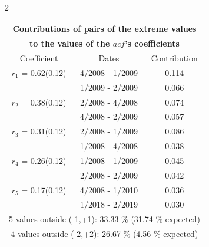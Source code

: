 
\thispagestyle{empty}
\begin{multicols}{2}{ 
\begin{tabular}{ccc}
\multicolumn{3}{c}{\textbf{Contributions of pairs of the extreme values} }  \vspace{-.10in}  \\ 
\multicolumn{3}{c}{ \textbf{to the values of the $acf$'s coefficients}} \\ 
\hline 
\hline                  Coefficient  &  Dates &  Contribution \\ 
\hline 
  $r_{ 1}$ = 0.62(0.12) &       4/2008 -  1/2009 &        0.114   \vspace{-.10in} \\  
&        1/2009 -  2/2009 &        0.066  \vspace{-.02in} \\ \hline 
  $r_{ 2}$ = 0.38(0.12) &       2/2008 -  4/2008 &        0.074   \vspace{-.10in} \\  
&        4/2008 -  2/2009 &        0.057  \vspace{-.02in} \\ \hline 
  $r_{ 3}$ = 0.31(0.12) &       2/2008 -  1/2009 &        0.086   \vspace{-.10in} \\  
&        1/2008 -  4/2008 &        0.038  \vspace{-.02in} \\ \hline 
  $r_{ 4}$ = 0.26(0.12) &       1/2008 -  1/2009 &        0.045   \vspace{-.10in} \\  
&        2/2008 -  2/2009 &        0.042  \vspace{-.02in} \\ \hline 
  $r_{ 5}$ = 0.17(0.12) &       4/2008 -  1/2010 &        0.036   \vspace{-.10in} \\  
&        1/2018 -  2/2019 &        0.030  \vspace{-.02in} \\ \hline 
\multicolumn{3}{c}{               5 values outside (-1,+1): 33.33  \% (31.74  \% expected)}\vspace{-.10in} \\ 
\multicolumn{3}{c}{               4 values outside (-2,+2): 26.67 \%  (4.56 \% expected) } \\
 \end{tabular} \\ 
 } 
\end{multicols} 
